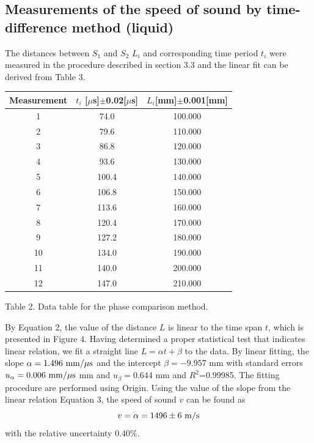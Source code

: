 \documentclass[a4paper]{report}
\begin{document}
	\subsection{Measurements of the speed of sound by time- difference method (liquid)}
	The distances between $S_1$ and $S_2$ $L_i$ and corresponding time period $t_i$ were measured in the procedure described in section 3.3 and the linear fit can be derived from Table 3.
	\begin{tabular}{|c|c|c|}
		\hline
		Measurement&$t_i$ [$\mu$s]$\pm$0.02[$\mu$s]&$L_i$[mm]$\pm$0.001[mm]\\
		\hline
		1&74.0&100.000\\
		\hline
		2&79.6&110.000\\
		\hline
		3&86.8&120.000\\
		\hline
		4&93.6&130.000\\
		\hline
		5&100.4&140.000\\
		\hline
		6&106.8&150.000\\
		\hline
		7&113.6&160.000\\
		\hline
		8&120.4&170.000\\
		\hline
		9&127.2&180.000\\
		\hline
		10&134.0&190.000\\
		\hline
		11&140.0&200.000\\
		\hline
		12&147.0&210.000\\
		\hline
	\end{tabular}
	\begin{center}
		Table 2. Data table for the phase comparison method.
	\end{center}
	By Equation 2, the value of the distance $L$ is linear to the time span $t$, which is presented in Figure 4. Having determined a proper statistical test that indicates linear relation, we fit a straight line $L=\alpha t+\beta$ to the data. By linear fitting, the slope $\alpha=1.496\ \rm{mm/\mu s}$ and the intercept $\beta=-9.957$ mm with standard errors $u_\alpha=0.006\ \rm{mm/\mu s}$ mm and $u_\beta=0.644$ mm and $R^2$=0.99985. The fitting procedure are performed using Origin.
	Using the value of the slope from the linear relation Equation 3, the speed of sound $v$ can be found as
	\begin{equation}
	v=\alpha=1496\pm6\ \rm{m/s}
	\end{equation}
	with the relative uncertainty 0.40\%.
\end{document}
